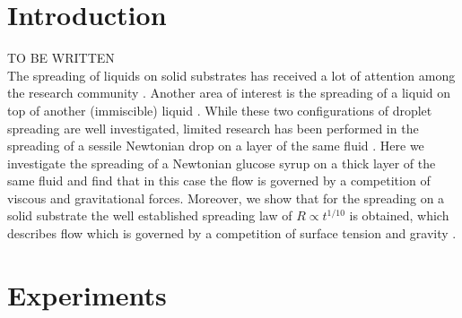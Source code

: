 \documentclass[aip,graphicx]{revtex4-1}
\begin{document}
\pacs{}%

\maketitle %

\section{Introduction}
\label{sec:introduction}

\noindent TO BE WRITTEN\\
The spreading of liquids on solid substrates has received a lot of attention among the research community \cite{de1985wetting, bonn2009wetting}.
Another area of interest is the spreading of a liquid on top of another (immiscible) liquid \cite{fraaije1989dynamics, joos1977spreading}.
While these two configurations of droplet spreading are well investigated, limited research has been performed in the spreading of a sessile Newtonian drop on a layer of the same fluid \cite{tanner1979spreading, cormier2012beyond, chebbi1999capillary}.
Here we investigate the spreading of a Newtonian glucose syrup on a thick layer of the same fluid and find that in this case the flow is governed by a competition of viscous and gravitational forces.
Moreover, we show that for the spreading on a solid substrate the well established spreading law of $R \propto t^{1/10}$ is obtained, which describes flow which is governed by a competition of surface tension and gravity \cite{bonn2009wetting}.

\section{Experiments}
\label{sec:experiments}
\end{document}
